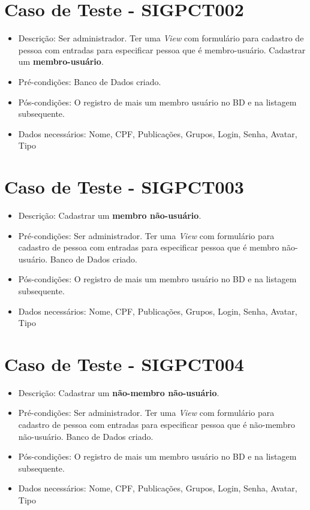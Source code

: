 \documentclass[11pt, a4paper]{book}
\begin{document}
	\section{Caso de Teste - SIGPCT002 }
	\begin{itemize}
	\item Descrição: Ser administrador. Ter uma \emph{View} com formulário para cadastro de pessoa com entradas para especificar pessoa que é membro-usuário. Cadastrar um \textbf{membro-usuário}.
	\item Pré-condições: Banco de Dados criado.
	\item Pós-condições: O registro de mais um membro usuário no BD e na listagem subsequente.
	\item Dados necessários: Nome, CPF, Publicações, Grupos, Login, Senha, Avatar, Tipo
	\end{itemize}

	\section{Caso de Teste - SIGPCT003}
	\begin{itemize}
	\item Descrição: Cadastrar um \textbf{membro não-usuário}.
	\item Pré-condições: Ser administrador. Ter uma \emph{View} com formulário para cadastro de pessoa com entradas para especificar pessoa que é membro não-usuário. Banco de Dados criado.
	\item Pós-condições: O registro de mais um membro usuário no BD e na listagem subsequente.
	\item Dados necessários: Nome, CPF, Publicações, Grupos, Login, Senha, Avatar, Tipo
	\end{itemize}

	\section{Caso de Teste - SIGPCT004}
	\begin{itemize}
	\item Descrição: Cadastrar um \textbf{não-membro não-usuário}.
	\item Pré-condições: Ser administrador. Ter uma \emph{View} com formulário para cadastro de pessoa com entradas para especificar pessoa que é não-membro não-usuário. Banco de Dados criado.
	\item Pós-condições: O registro de mais um membro usuário no BD e na listagem subsequente.
	\item Dados necessários:  Nome, CPF, Publicações, Grupos, Login, Senha, Avatar, Tipo
	\end{itemize}
\end{document}
